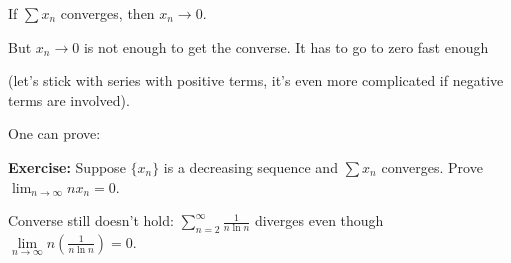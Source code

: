 \documentclass[10pt,aspectratio=149]{beamer}
\begin{document}
\begin{frame}

If $\sum x_n$ converges, then $x_n \to 0$.  

\pause
\medskip

But $x_n \to 0$ is not enough to get the converse.
It has to go to zero fast enough

(let's stick with series with positive terms, it's even more
complicated if negative terms are involved).

\pause
\medskip

One can prove:

\medskip

\textbf{Exercise:}
Suppose $\{ x_n \}$ is a decreasing sequence and $\sum x_n$ converges.
Prove $\displaystyle \lim_{n\to\infty} n x_n = 0$.

\pause
\medskip

Converse still doesn't hold:
$\sum\limits_{n=2}^\infty \frac{1}{n \ln n}$ diverges
even though $\lim\limits_{n\to \infty} n \left( \frac{1}{n \ln n} \right) = 0$.

\end{frame}
\end{document}
